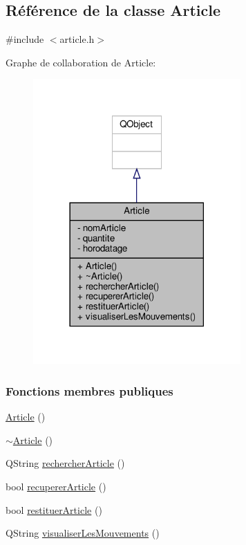 \hypertarget{class_article}{}\subsection{Référence de la classe Article}
\label{class_article}


{\ttfamily \#include $<$article.\+h$>$}



Graphe de collaboration de Article\+:\nopagebreak
\begin{figure}[H]
\begin{center}
\leavevmode
\includegraphics[width=225pt]{class_article__coll__graph}
\end{center}
\end{figure}
\subsubsection*{Fonctions membres publiques}
\begin{DoxyCompactItemize}
\item 
\hyperlink{class_article_aba1b3142ede0565d468cb4135384c96f}{Article} ()
\item 
\hyperlink{class_article_a5c429e49b30104b1069044d0e1a6aa1a}{$\sim$\+Article} ()
\item 
Q\+String \hyperlink{class_article_ad7b031dd9bd88a84006f2ff83262c42d}{rechercher\+Article} ()
\item 
bool \hyperlink{class_article_a6200b67a7afe1c4e937c4087e23cdfc4}{recuperer\+Article} ()
\item 
bool \hyperlink{class_article_acd0f9d62ff85d4254d3ca6ab87d474e2}{restituer\+Article} ()
\item 
Q\+String \hyperlink{class_article_a47f169939af6d2d3e840392c85c88121}{visualiser\+Les\+Mouvements} ()
\end{DoxyCompactItemize}
